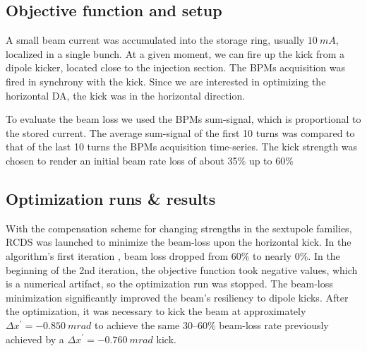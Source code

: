 \subsection{Objective function and setup}
A small beam current was accumulated into the storage ring, usually $10~\unit{mA}$, localized in a single bunch. At a given moment, we can fire up the kick from a dipole kicker, located close to the injection section. The BPMs acquisition was fired in synchrony with the kick. Since we are interested in optimizing the horizontal DA, the kick was in the horizontal direction.

To evaluate the beam loss we used the BPMs sum-signal, which is proportional to the stored current. The average sum-signal of the first 10 turns was compared to that of the last 10 turns the BPMs acquisition time-series. The kick strength was chosen to render an initial beam rate loss of about 35\% up to 60\%
\subsection{Optimization runs \& results}
With the compensation scheme for changing strengths in the sextupole families, RCDS was launched to minimize the beam-loss upon the horizontal kick. In the algorithm's first iteration
, beam loss dropped from 60\% to nearly 0\%. In the beginning of the 2nd iteration, the objective function took negative values, which is a numerical artifact, so the optimization run was stopped. The beam-loss minimization significantly improved the beam's resiliency to dipole kicks. After the optimization, it was necessary to kick the beam at approximately $\Delta x^\prime=-0.850~\unit{m rad}$ to achieve the same  30--60\% beam-loss rate previously achieved by a $\Delta x^\prime=-0.760~\unit{m rad}$ kick.

